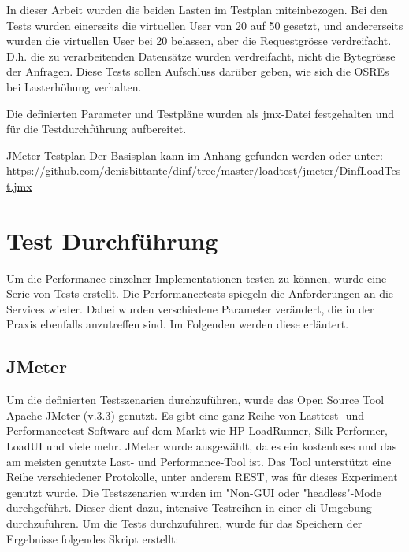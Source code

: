 \documentclass[main.tex]{subfiles}
\begin{document}
In dieser Arbeit wurden die beiden Lasten im Testplan miteinbezogen. Bei den Tests wurden einerseits die virtuellen User von 20 auf 50 gesetzt, und andererseits wurden die virtuellen User bei 20 belassen, aber die Requestgrösse verdreifacht. D.h. die zu verarbeitenden Datensätze wurden verdreifacht, nicht die Bytegrösse der Anfragen. Diese Tests sollen Aufschluss darüber geben, wie sich die OSREs bei Lasterhöhung verhalten.

Die definierten Parameter und Testpläne wurden als jmx-Datei festgehalten und für die Testdurchführung aufbereitet.

\begin{reference}{JMeter Testplan}
Der Basisplan kann im Anhang gefunden werden oder unter: 
 \url{https://github.com/denisbittante/dinf/tree/master/loadtest/jmeter/DinfLoadTest.jmx}
 
\end{reference}



\section{Test Durchführung}


Um die Performance einzelner Implementationen testen zu können, wurde eine Serie von Tests erstellt. Die Performancetests spiegeln die Anforderungen an die Services wieder. Dabei wurden verschiedene Parameter verändert, die in der Praxis ebenfalls anzutreﬀen sind. Im Folgenden werden diese erläutert.

\subsection{JMeter}


Um die definierten Testszenarien durchzuführen, wurde das Open Source Tool Apache JMeter (v.3.3) genutzt. Es gibt eine ganz Reihe von Lasttest- und Performancetest-Software auf dem Markt wie HP LoadRunner, Silk Performer, LoadUI und viele mehr. JMeter wurde ausgewählt, da es ein kostenloses und das am meisten genutzte Last- und Performance-Tool ist. Das Tool unterstützt eine Reihe verschiedener Protokolle, unter anderem REST, was für dieses Experiment genutzt wurde. Die Testszenarien wurden im "Non-GUI oder "headless"-Mode durchgeführt. Dieser dient dazu, intensive Testreihen in einer \acrshort{cli}-Umgebung durchzuführen. Um die Tests durchzuführen, wurde für das Speichern der Ergebnisse folgendes Skript erstellt:
\end{document}
